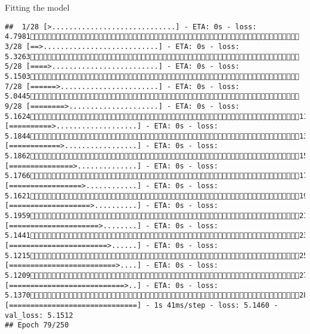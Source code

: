 \documentclass[
  ignorenonframetext,
]{beamer}
\begin{document}
\begin{frame}[fragile]{Fitting the model}
\begin{verbatim}
##  1/28 [>.............................] - ETA: 0s - loss: 4.7981 3/28 [==>...........................] - ETA: 0s - loss: 5.3263 5/28 [====>.........................] - ETA: 0s - loss: 5.1503 7/28 [======>.......................] - ETA: 0s - loss: 5.0445 9/28 [========>.....................] - ETA: 0s - loss: 5.162411/28 [==========>...................] - ETA: 0s - loss: 5.184413/28 [============>.................] - ETA: 0s - loss: 5.186215/28 [===============>..............] - ETA: 0s - loss: 5.176617/28 [=================>............] - ETA: 0s - loss: 5.162119/28 [===================>..........] - ETA: 0s - loss: 5.195921/28 [=====================>........] - ETA: 0s - loss: 5.144123/28 [=======================>......] - ETA: 0s - loss: 5.121525/28 [=========================>....] - ETA: 0s - loss: 5.120927/28 [===========================>..] - ETA: 0s - loss: 5.137028/28 [==============================] - 1s 41ms/step - loss: 5.1460 - val_loss: 5.1512
## Epoch 79/250

\end{verbatim}
\end{frame}
\end{document}
